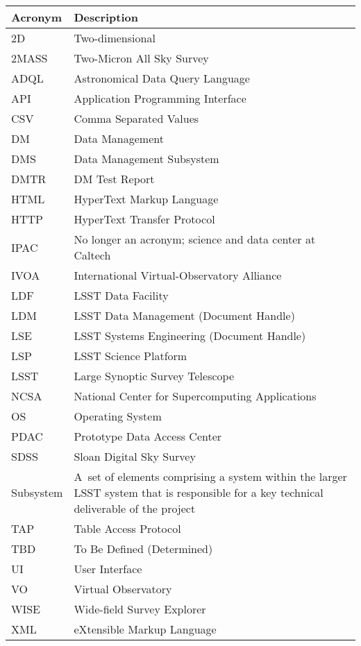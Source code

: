 \addtocounter{table}{-1}
\begin{longtable}{p{}p{}}\hline
\textbf{Acronym} & \textbf{Description}  \\\hline

2D & Two-dimensional \\\hline
2MASS & Two-Micron All Sky Survey \\\hline
ADQL & Astronomical Data Query Language \\\hline
API & Application Programming Interface \\\hline
CSV & Comma Separated Values \\\hline
DM & Data Management \\\hline
DMS & Data Management Subsystem \\\hline
DMTR & DM Test Report \\\hline
HTML & HyperText Markup Language \\\hline
HTTP & HyperText Transfer Protocol \\\hline
IPAC & No longer an acronym; science and data center at Caltech \\\hline
IVOA & International Virtual-Observatory Alliance \\\hline
LDF & LSST Data Facility \\\hline
LDM & LSST Data Management (Document Handle) \\\hline
LSE & LSST Systems Engineering (Document Handle) \\\hline
LSP & LSST Science Platform \\\hline
LSST & Large Synoptic Survey Telescope \\\hline
NCSA & National Center for Supercomputing Applications \\\hline
OS & Operating System \\\hline
PDAC & Prototype Data Access Center \\\hline
SDSS & Sloan Digital Sky Survey \\\hline
Subsystem & A set of elements comprising a system within the larger LSST system that is responsible for a key technical deliverable of the project \\\hline
TAP & Table Access Protocol \\\hline
TBD & To Be Defined (Determined) \\\hline
UI & User Interface \\\hline
VO & Virtual Observatory \\\hline
WISE & Wide-field Survey Explorer \\\hline
XML & eXtensible Markup Language \\\hline
\end{longtable}
